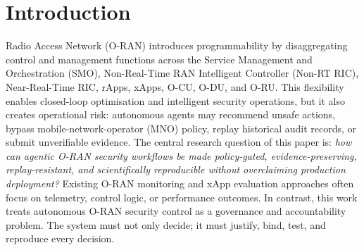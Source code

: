\documentclass[journal]{IEEEtran}
\begin{document}
\section{Introduction}
 Radio Access Network (O-RAN) introduces programmability
by disaggregating control and management functions across the Service
Management and Orchestration (SMO), Non-Real-Time RAN Intelligent Controller
(Non-RT RIC), Near-Real-Time RIC, rApps, xApps, O-CU, O-DU, and O-RU. This
flexibility enables closed-loop optimisation and intelligent security
operations, but it also creates operational risk: autonomous agents may
recommend unsafe actions, bypass mobile-network-operator (MNO) policy, replay
historical audit records, or submit unverifiable evidence.
The central research question of this paper is: \emph{how can agentic O-RAN
security workflows be made policy-gated, evidence-preserving,
replay-resistant, and scientifically reproducible without overclaiming
production deployment?} Existing O-RAN monitoring and xApp evaluation
approaches often focus on telemetry, control logic, or performance outcomes.
In contrast, this work treats autonomous O-RAN security control as a
governance and accountability problem. The system must not only decide; it
must justify, bind, test, and reproduce every decision.
\end{document}
